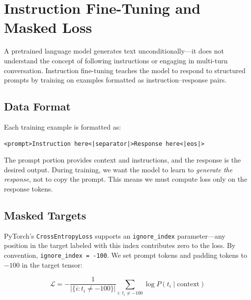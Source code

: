 \section{Instruction Fine-Tuning and Masked Loss}

A pretrained language model generates text unconditionally---it does not
understand the concept of following instructions or engaging in
multi-turn conversation. Instruction fine-tuning teaches the model to
respond to structured prompts by training on examples formatted as
instruction--response pairs.

\subsection{Data Format}

Each training example is formatted as:

\begin{center}
\texttt{<prompt>Instruction here<|separator|>Response here<|eos|>}
\end{center}

The prompt portion provides context and instructions, and the response
is the desired output. During training, we want the model to learn to
\emph{generate the response}, not to copy the prompt. This means we
must compute loss only on the response tokens.

\subsection{Masked Targets}

PyTorch's \texttt{CrossEntropyLoss} supports an \texttt{ignore\_index}
parameter---any position in the target labeled with this index
contributes zero to the loss. By convention, \texttt{ignore\_index =
-100}. We set prompt tokens and padding tokens to $-100$ in the target
tensor:

\[
  \mathcal{L} = -\frac{1}{|\{i : t_i \neq -100\}|}\sum_{i:\, t_i \neq -100} \log P(t_i \mid \text{context})
\]

